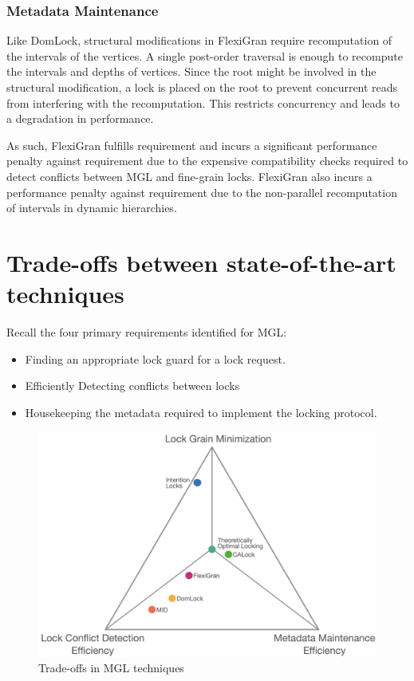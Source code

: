 \subsubsection{Metadata Maintenance}

Like DomLock, structural modifications in FlexiGran require recomputation of the intervals of the vertices. A single post-order traversal is enough to recompute the intervals and depths of vertices. Since the root might be involved in the structural modification, a lock is placed on the root to prevent concurrent reads from interfering with the recomputation. This restricts concurrency and leads to a degradation in performance. 

As such, FlexiGran fulfills requirement \Rb and incurs a significant performance penalty against requirement \Rc due to the expensive compatibility checks required to detect conflicts between MGL and fine-grain locks. FlexiGran also incurs a performance penalty against requirement \Rd due to the non-parallel recomputation of intervals in dynamic hierarchies.



\section{Trade-offs between state-of-the-art techniques}

Recall the four primary requirements identified for MGL:
\begin{itemize}
    \item[\Rb] Finding an appropriate lock guard for a lock request.
    \item[\Rc] Efficiently Detecting conflicts between locks
    \item[\Rd] Housekeeping the metadata required to implement the locking protocol.
\end{itemize}

\begin{figure}[h]
    \centering
    \captionsetup{justification=centering}
    \includegraphics[width=.9\textwidth]{figures/MGL_comparision.png}
    \caption{Trade-offs in MGL techniques}
    \label{fig:tradeoffs}
\end{figure}


